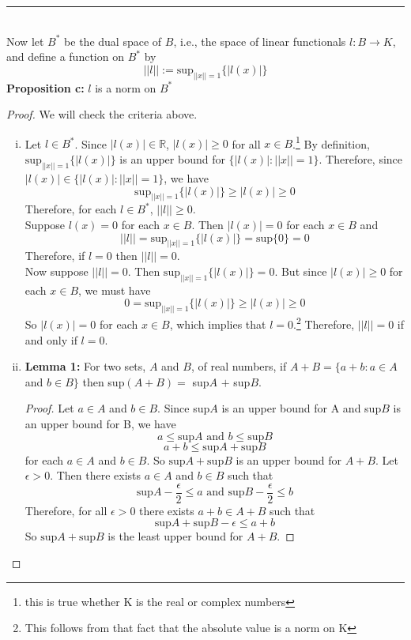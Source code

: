 \documentclass[]{book}
\begin{document}
\noindent\rule{15cm}{0.4pt} \\

Now let $B^*$ be the dual space of $B$, i.e., the space of linear functionals $l:B\to K$, and define a function on $B^*$ by $$||l||:= \textrm{sup}_{||x||=1}\{|l(x)|\}$$
{\bf Proposition c:} $l$ is a norm on $B^*$
\begin{proof}
We will check the criteria above.
\begin{enumerate}[(i)]
\item Let $l\in B^*$. Since $|l(x)|\in \mathbb{R}$, $|l(x)|\geqslant 0$ for all $x\in B$.\footnote{this is true whether K is the real or complex numbers} By definition, $\textrm{sup}_{||x||=1}\{|l(x)|\}$ is an upper bound for $\{|l(x)| : ||x||=1\}$. Therefore, since $|l(x)|\in \{|l(x)| : ||x||=1\}$, we have $$\textrm{sup}_{||x||=1}\{|l(x)|\} \geqslant |l(x)|\geqslant 0$$
Therefore, for each $l\in B^*$, $||l|| \geqslant 0$. \\
Suppose $l(x)=0$ for each $x\in B$. Then $|l(x)|=0$ for each $x\in B$ and $$||l||=\textrm{sup}_{||x||=1}\{|l(x)|\}=\textrm{sup}\{0\}=0$$
Therefore, if $l=0$ then $||l||=0$. \\
Now suppose $||l||=0$. Then $\textrm{sup}_{||x||=1}\{|l(x)|\}=0$. But since $|l(x)|\geqslant 0$ for each $x\in B$, we must have $$0=\textrm{sup}_{||x||=1}\{|l(x)|\} \geqslant |l(x)|\geqslant 0$$
So $|l(x)|=0$ for each $x\in B$, which implies that $l=0$.\footnote{This follows from that fact that the absolute value is a norm on K} Therefore, $||l||=0$ if and only if $l=0$. \\
\item {\bf Lemma 1:} For two sets, $A$ and $B$, of real numbers, if $A+B=\{a+b:a\in A$ and $b\in B\}$ then sup$(A+B)=$ sup$A$ $+$ sup$B$.
\begin{proof}
Let $a\in A$ and $b\in B$. Since sup$A$ is an upper bound for A and sup$B$ is an upper bound for B, we have $$a \leqslant \textrm{sup}A \textrm{ and } b\leqslant \textrm{sup}B$$
$$a+b \leqslant \textrm{sup}A + \textrm{sup}B$$
 for each $a\in A$ and $b\in B$. So $\textrm{sup}A + \textrm{sup}B$ is an upper bound for $A+B$. Let $\epsilon>0$. Then there exists $a\in A$ and $b\in B$ such that $$\textrm{sup}A-\frac{\epsilon}{2} \leqslant a \textrm{ and } \textrm{sup}B - \frac{\epsilon}{2} \leqslant b$$
 Therefore, for all $\epsilon>0$ there exists $a+b\in A+B$ such that
 $$\textrm{sup}A+\textrm{sup}B - \epsilon \leqslant a+b$$
 So $\textrm{sup}A+\textrm{sup}B$ is the least upper bound for $A+B$. 
\end{proof}

\end{enumerate}
\end{proof}
\end{document}
